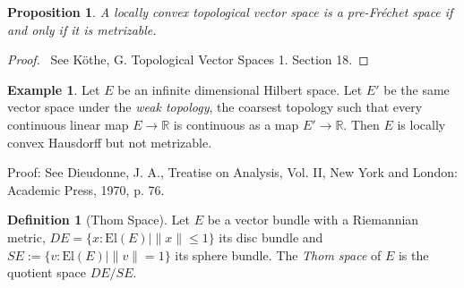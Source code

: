 \documentclass{book}
\let\qed\relax
\newtheorem{prop}[ax]{Proposition}
\theoremstyle{definition}
\newtheorem{df}[ax]{Definition}
\newtheorem{ex}[ax]{Example}
\newcommand{\El}[1]{\ensuremath{\mathrm{El} \left( {#1} \right)}}
\begin{document}
\begin{prop}
A locally convex topological vector space is a pre-Fr\'{e}chet space if and only if it is metrizable.
\end{prop}

\begin{proof}
\pf\ See K\"{o}the, G. Topological Vector Spaces 1. Section 18. \qed
\end{proof}

\begin{ex}
Let $E$ be an infinite dimensional Hilbert space. Let $E'$ be the same vector space under the \emph{weak topology}, the coarsest topology such that every continuous linear map $E \rightarrow \mathbb{R}$ is continuous as a map $E' \rightarrow \mathbb{R}$. Then $E$ is locally convex Hausdorff but not metrizable.

Proof: See Dieudonne, J. A., Treatise on Analysis, Vol. II, New York and London: Academic Press, 1970, p. 76.
\end{ex}

\begin{df}[Thom Space]
Let $E$ be a vector bundle with a Riemannian metric, $DE = \{ x : \El{E} \mid \| x \| \leq 1 \}$ its disc bundle and $SE := \{ v : \El{E} \mid \| v \| = 1 \}$ its sphere bundle. The \emph{Thom space} of $E$ is the quotient space $DE / SE$.
\end{df}
\end{document}
